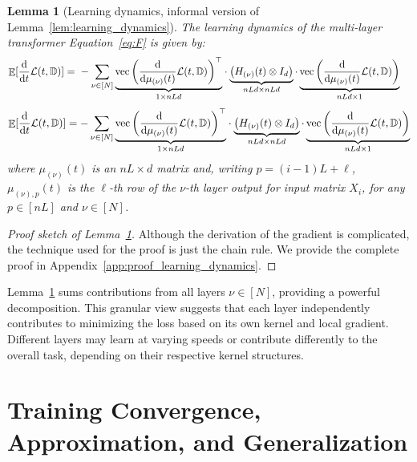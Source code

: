 \documentclass[11pt]{article}
\theoremstyle{plain}
\newtheorem{lemma}[theorem]{Lemma}
\renewcommand{\d}{\mathrm{d}}
\DeclareMathOperator*{\E}{{\mathbb{E}}}
\DeclareMathOperator{\vect}{vec}
\begin{document}
\begin{lemma}[Learning dynamics, informal version of Lemma~\ref{lem:learning_dynamics}]\label{lem:learning_dynamics:informal}
    The learning dynamics of the multi-layer transformer Equation~\eqref{eq:F} is given by:
    \ifdefined\isarxiv
    \begin{align*}
        \E[\frac{\d }{\d t}{\cal L}(t, \mathbb{D})] =& ~  - \sum_{\nu \in [N]} {\underbrace{\vect\left(\frac{\d }{\d \mu_{(\nu)}(t)}{\cal L}(t, \mathbb{D}) \right)^\top}_{1 \times nLd}}  \cdot \underbrace{\left( H_{(\nu)}(t) \otimes I_d \right)}_{nLd \times nLd} \cdot  \underbrace{\vect\left(\frac{\d }{\d \mu_{(\nu)}(t)}{\cal L}(t, \mathbb{D}) \right)}_{nLd \times 1}
    \end{align*}
    \else
    \begin{align*}
        \E[\frac{\d }{\d t}{\cal L}(t, \mathbb{D})] = - \sum_{\nu \in [N]} {\underbrace{\vect\left(\frac{\d }{\d \mu_{(\nu)}(t)}{\cal L}(t, \mathbb{D}) \right)^\top}_{1 \times nLd}} \cdot \underbrace{\left( H_{(\nu)}(t) \otimes I_d \right)}_{nLd \times nLd} \cdot  \underbrace{\vect\left(\frac{\d }{\d \mu_{(\nu)}(t)}{\cal L}(t, \mathbb{D}) \right)}_{nLd \times 1}
    \end{align*}
    \fi
    where $\mu_{(\nu)}(t)$ is an $nL \times d$ matrix and, writing $p = (i-1)L+\ell$, $\mu_{(\nu), p}(t)$ is the $\ell$-th row of the $\nu$-th layer output for input matrix $X_{i}$, for any $p \in [nL]$ and $\nu \in [N]$.
\end{lemma}
\begin{proof}[Proof sketch of Lemma~\ref{lem:learning_dynamics:informal}]
    Although the derivation of the gradient is complicated, the technique used for the proof is just the chain rule. We provide the complete proof in Appendix~\ref{app:proof_learning_dynamics}.
\end{proof}

Lemma~\ref{lem:learning_dynamics:informal} sums contributions from all layers $\nu \in [N]$, providing a powerful decomposition. This granular view suggests that each layer independently contributes to minimizing the loss based on its own kernel and local gradient. Different layers may learn at varying speeds or contribute differently to the overall task, depending on their respective kernel structures.%
\section{Training Convergence, Approximation, and Generalization}\label{sec:convergence}
\end{document}
